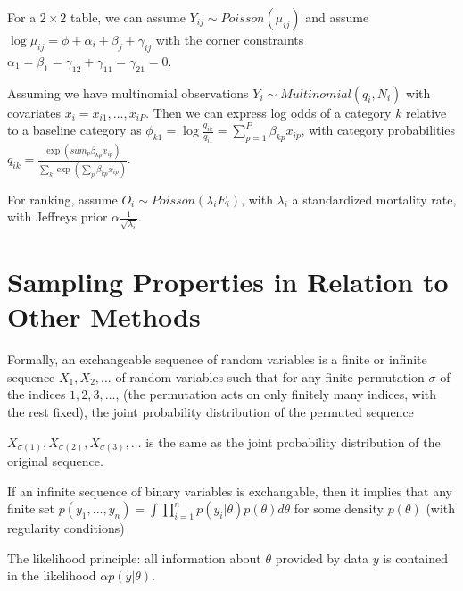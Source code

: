 For a $2 \times 2$ table, we can assume $Y_{ij} \sim
Poisson(\mu_{ij})$ and assume $\log \mu_{ij} = \phi + \alpha_{i} +
\beta_{j} + \gamma_{ij}$ with the corner constraints $\alpha_{1} =
\beta_{1} = \gamma_{12} + \gamma_{11} = \gamma_{21} = 0$.

Assuming we have multinomial observations $Y_{i} \sim
Multinomial(q_{i}, N_{i})$ with covariates $x_{i} = x_{i1}, \dots,
x_{iP}$.  Then we can express log odds of a category $k$ relative to a
baseline category as $\phi_{k1} = \log \frac{q_{ik}}{q_{i1}} =
\sum_{p=1}^{P} \beta_{kp} x_{ip}$, with category probabilities $q_{ik}
= \frac{\exp(sum_{p} \beta_{kp} x_{ip})}{\sum_{k}^{} \exp(\sum_{p}^{}
  \beta_{kp} x_{ip})}$.

\begin{defn}
  \label{sec:categ-data-pred-2}
  For ranking, assume $O_{i} \sim Poisson(\lambda_{i} E_{i})$, with
  $\lambda_{i}$ a standardized mortality rate, with Jeffreys prior
  $\alpha \frac{1}{\sqrt{\lambda_{i}}}$.
\end{defn}

\section{Sampling Properties in Relation to Other Methods}
\label{sec:sampl-prop-relat}

\begin{defn}
  Formally, an exchangeable sequence of random variables is a finite
  or infinite sequence $X_{1}, X_{2}, \dots$ of random variables such
  that for any finite permutation $\sigma$ of the indices $1, 2, 3,
  \dots$, (the permutation acts on only finitely many indices, with
  the rest fixed), the joint probability distribution of the permuted
  sequence

  $X_{\sigma(1)}, X_{\sigma(2)}, X_{\sigma(3)}, \dots$ is the same as
  the joint probability distribution of the original
  sequence.
\end{defn}

\begin{thm}
  \label{sec:sampl-prop-relat-2}
  If an infinite sequence of binary variables is exchangable, then it
  implies that any finite set $p(y_{1}, \dots, y_{n}) = \int
  \prod_{i=1}^{n} p(y_{i} | \theta) p(\theta) d \theta$ for some
  density $p(\theta)$ (with regularity conditions)
\end{thm}

\begin{defn}
  \label{sec:sampl-prop-relat-3}
  The likelihood principle: all information about $\theta$ provided by
  data $y$ is contained in the likelihood $\alpha p(y | \theta)$.
\end{defn}


